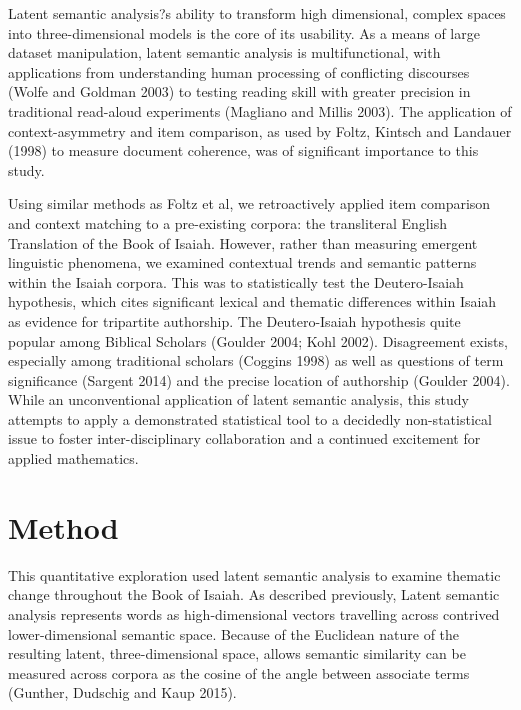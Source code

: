 \documentclass{statsoc}
\begin{document}
Latent semantic analysis?s ability to transform high dimensional, complex spaces into three-dimensional models is the core of its usability. As a means of large dataset manipulation, latent semantic analysis is multifunctional, with applications from understanding human processing of conflicting discourses (Wolfe and Goldman 2003) to testing reading skill with greater precision in traditional read-aloud experiments (Magliano and Millis 2003). The application of context-asymmetry and item comparison, as used by Foltz, Kintsch and Landauer (1998) to measure document coherence, was of significant importance to this study. 

Using similar methods as Foltz et al, we retroactively applied item comparison and context matching to a pre-existing corpora: the transliteral English Translation of the Book of Isaiah. However, rather than measuring emergent linguistic phenomena, we examined contextual trends and semantic patterns within the Isaiah corpora. This was to statistically test the Deutero-Isaiah hypothesis, which cites significant lexical and thematic differences within Isaiah as evidence for tripartite authorship. The Deutero-Isaiah hypothesis quite popular among Biblical Scholars (Goulder 2004; Kohl 2002). Disagreement exists, especially among traditional scholars (Coggins 1998) as well as questions of term significance (Sargent 2014) and the precise location of authorship (Goulder 2004). While an unconventional application of latent semantic analysis, this study attempts to apply a demonstrated statistical tool to a decidedly non-statistical issue to foster inter-disciplinary collaboration and a continued excitement for applied mathematics.

\section{Method}
This quantitative exploration used latent semantic analysis to examine thematic change throughout the Book of Isaiah. As described previously, Latent semantic analysis represents words as high-dimensional vectors travelling across contrived lower-dimensional semantic space. Because of the Euclidean nature of the resulting latent, three-dimensional space, allows semantic similarity can be measured across corpora as the cosine of the angle between associate terms (Gunther, Dudschig and Kaup 2015). 
\end{document}
